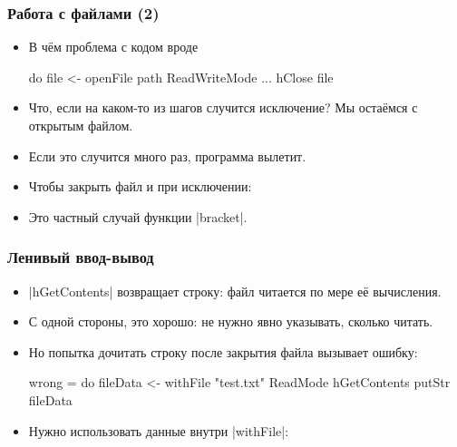 \documentclass[11pt]{beamer}
\begin{document}
\begin{frame}[fragile]
  \frametitle{Работа с файлами (2)}
  \begin{itemize}
    \item В чём проблема с кодом вроде
          \begin{haskell}
            do
              file <- openFile path ReadWriteMode
              ...
              hClose file
          \end{haskell}
          \pause
    \item Что, если на каком-то из шагов случится исключение? Мы остаёмся с открытым файлом.
    \item Если это случится много раз, программа вылетит.
          \pause
    \item Чтобы закрыть файл и при исключении:
    \item Это частный случай функции \haskinline|bracket|.
  \end{itemize}
\end{frame}

\begin{frame}[fragile]
  \frametitle{Ленивый ввод-вывод}
  \begin{itemize}
    \item \haskinline|hGetContents| возвращает строку: файл читается по мере её вычисления.
    \item С одной стороны, это хорошо: не нужно явно указывать, сколько читать.
    \item Но попытка дочитать строку после закрытия файла вызывает ошибку:
          \begin{haskellsmall}
            wrong = do
              fileData <-
                withFile "test.txt" ReadMode hGetContents
              putStr fileData
          \end{haskellsmall}
    \item Нужно использовать данные внутри \haskinline|withFile|:
  \end{itemize}
\end{frame}
\end{document}
